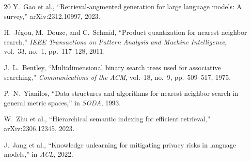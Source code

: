 \documentclass[11pt,a4paper]{article}
\begin{document}
\begin{thebibliography}{20}
Y.~Gao et al., ``Retrieval-augmented generation for large language models: A survey,'' arXiv:2312.10997, 2023.

H.~J{\'e}gou, M.~Douze, and C.~Schmid, ``Product quantization for nearest neighbor search,'' \textit{IEEE Transactions on Pattern Analysis and Machine Intelligence}, vol.~33, no.~1, pp.~117--128, 2011.

J.~L.~Bentley, ``Multidimensional binary search trees used for associative searching,'' \textit{Communications of the ACM}, vol.~18, no.~9, pp.~509--517, 1975.

P.~N.~Yianilos, ``Data structures and algorithms for nearest neighbor search in general metric spaces,'' in \textit{SODA}, 1993.

W.~Zhu et al., ``Hierarchical semantic indexing for efficient retrieval,'' arXiv:2306.12345, 2023.

J.~Jang et al., ``Knowledge unlearning for mitigating privacy risks in language models,'' in \textit{ACL}, 2022.

\end{thebibliography}
\end{document}
